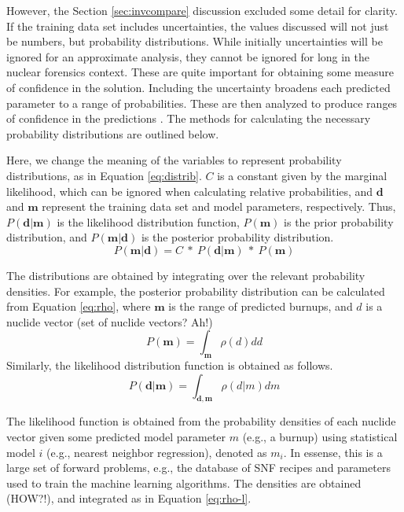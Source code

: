 However, the Section \ref{sec:invcompare} discussion excluded some detail for
clarity. If the training data set includes uncertainties, the values discussed
will not just be numbers, but probability distributions.  While initially
uncertainties will be ignored for an approximate analysis, they cannot be
ignored for long in the nuclear forensics context. These are quite important
for obtaining some measure of confidence in the solution.  Including the
uncertainty broadens each predicted parameter to a range of probabilities.
These are then analyzed to produce ranges of confidence in the predictions
\cite{bayes_compare}.  The methods for calculating the necessary probability
distributions are outlined below.

Here, we change the meaning of the variables to represent probability
distributions, as in Equation \ref{eq:distrib}.  $C$ is a constant given by the
marginal likelihood, which can be ignored when calculating relative
probabilities, and $\boldsymbol{d}$ and $\boldsymbol{m}$ represent the training
data set and model parameters, respectively. Thus,
$P(\boldsymbol{d}|\boldsymbol{m})$ is the likelihood distribution function,
$P(\boldsymbol{m})$ is the prior probability distribution, and
$P(\boldsymbol{m}|\boldsymbol{d})$ is the posterior probability distribution.
\begin{equation}
\label{eq:distrib}
  P(\boldsymbol{m}|\boldsymbol{d}) = C\ *\
  P(\boldsymbol{d}|\boldsymbol{m})\ *\ P(\boldsymbol{m})
\end{equation}

The distributions are obtained by integrating over the relevant probability
densities.  For example, the posterior probability distribution can be
calculated from Equation \ref{eq:rho}, where $\boldsymbol{m}$ is the range of
predicted burnups, and $d$ is a nuclide vector (set of nuclide vectors? Ah!)
\begin{equation}
\label{eq:rho}
  P(\boldsymbol{m}) = \int_{\boldsymbol{m}} \rho(d) dd
\end{equation}
Similarly, the likelihood distribution function is obtained as follows.
\begin{equation}
\label{eq:rho-l}
  P(\boldsymbol{d}|\boldsymbol{m}) = \int_{\boldsymbol{d}, \boldsymbol{m}} \rho(d|m) dm
\end{equation}


The likelihood function is obtained from the probability densities of each
nuclide vector given some predicted model parameter $m$ (e.g., a burnup) using
statistical model $i$ (e.g., nearest neighbor regression), denoted as $m_i$.
In essense, this is a large set of forward problems, e.g., the database of
\gls{SNF} recipes and parameters used to train the machine learning algorithms.
The densities are obtained (HOW?!), and integrated as in Equation
\ref{eq:rho-l}.

